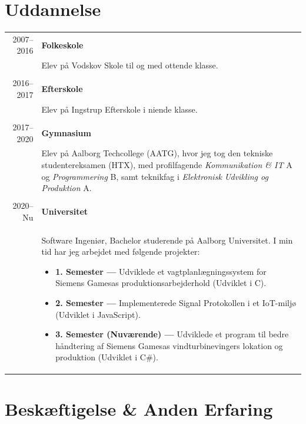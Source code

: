 \documentclass{article}
\begin{document}
    \section*{Uddannelse}
    \begin{tabular}{p{}|p{}} 
    \multicolumn{1}{r|}{2007--2016} & \textbf{Folkeskole}\\
    &   Elev på Vodskov Skole til og med ottende klasse.
        \\\\
    \multicolumn{1}{r|}{2016--2017} & \textbf{Efterskole}\\
    &   Elev på Ingstrup Efterskole i niende klasse.
        \\\\
    \multicolumn{1}{r|}{2017--2020} & \textbf{Gymnasium}\\
    &   Elev på Aalborg Techcollege (AATG), hvor jeg tog den tekniske studentereksamen (HTX),
        med profilfagende \textit{Kommunikation \& IT} A og \textit{Programmering} B, samt teknikfag i \textit{Elektronisk Udvikling og Produktion} A.
        \\\\
    \multicolumn{1}{r|}{2020--Nu} & \textbf{Universitet}\\
    &   Software Ingeniør, Bachelor studerende på Aalborg Universitet. I min tid har jeg arbejdet
        med følgende projekter:
        \begin{itemize}
            \item[] \textbf{1. Semester --- } Udviklede et vagtplanlægningssystem for Siemens Gamesas
                produktionsarbejderhold (Udviklet i C).
            \item[] \textbf{2. Semester --- } Implementerede Signal Protokollen i et IoT-miljø
                (Udviklet i JavaScript).
            \item[] \textbf{3. Semester (Nuværende) --- } Udviklede et program til bedre håndtering
                af Siemens Gamesas vindturbinevingers lokation og produktion (Udviklet i C\#).
        \end{itemize}
    \end{tabular}
 
    \section*{Beskæftigelse \& Anden Erfaring}
\end{document}
